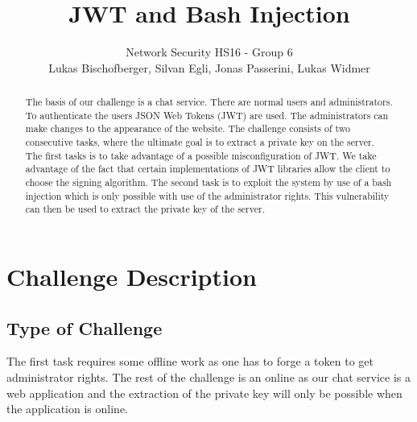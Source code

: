 \documentclass[12pt,a4paper]{article}
\title{JWT and Bash Injection} %
\author{Network Security HS16 - Group 6\\Lukas Bischofberger, Silvan Egli, Jonas Passerini, Lukas Widmer}
\begin{document}
\maketitle

\begin{abstract}

The basis of our challenge is a chat service. There are normal users and administrators. To authenticate the users JSON Web Tokens (JWT) are used. The administrators can make changes to the appearance of the website. The challenge consists of two consecutive tasks, where the ultimate goal is to extract a private key on the server. \\
The first tasks is to take advantage of a possible misconfiguration of JWT. We take advantage of the fact that certain implementations of JWT libraries allow the client to choose the signing algorithm.%
The second task is to exploit the system by use of a bash injection which is only possible with use of the administrator rights.%
This vulnerability can then be used to extract the private key of the server.
\end{abstract}

\section{Challenge Description}

\subsection{Type of Challenge}
The first task requires some offline work as one has to forge a token to get administrator rights. The rest of the challenge is an online as our chat service is a web application and the extraction of the private key will only be possible when the application is online.
\end{document}

